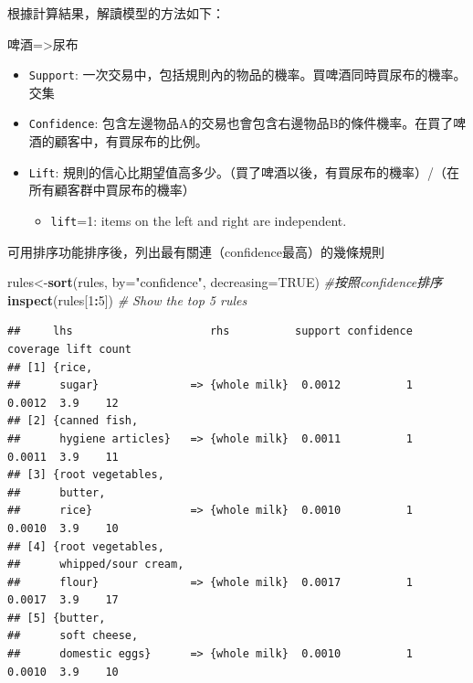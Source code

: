 \documentclass[
]{book}
\newenvironment{Shaded}{\begin{snugshade}}{\end{snugshade}}
\newcommand{\CommentTok}[1]{\textcolor[rgb]{0.56,0.35,0.01}{\textit{#1}}}
\newcommand{\DataTypeTok}[1]{\textcolor[rgb]{0.13,0.29,0.53}{#1}}
\newcommand{\DecValTok}[1]{\textcolor[rgb]{0.00,0.00,0.81}{#1}}
\newcommand{\KeywordTok}[1]{\textcolor[rgb]{0.13,0.29,0.53}{\textbf{#1}}}
\newcommand{\NormalTok}[1]{#1}
\newcommand{\OperatorTok}[1]{\textcolor[rgb]{0.81,0.36,0.00}{\textbf{#1}}}
\newcommand{\OtherTok}[1]{\textcolor[rgb]{0.56,0.35,0.01}{#1}}
\newcommand{\StringTok}[1]{\textcolor[rgb]{0.31,0.60,0.02}{#1}}
\providecommand{\tightlist}{%
  \setlength{\itemsep}{0pt}\setlength{\parskip}{0pt}}
\begin{document}
根據計算結果，解讀模型的方法如下：

啤酒=\textgreater 尿布

\begin{itemize}
\tightlist
\item
  \texttt{Support}: 一次交易中，包括規則內的物品的機率。買啤酒同時買尿布的機率。交集
\item
  \texttt{Confidence}: 包含左邊物品A的交易也會包含右邊物品B的條件機率。在買了啤酒的顧客中，有買尿布的比例。
\item
  \texttt{Lift}: 規則的信心比期望值高多少。（買了啤酒以後，有買尿布的機率）/（在所有顧客群中買尿布的機率）

  \begin{itemize}
  \tightlist
  \item
    \texttt{lift}=1: items on the left and right are independent.
  \end{itemize}
\end{itemize}

可用排序功能排序後，列出最有關連（confidence最高）的幾條規則

\begin{Shaded}
\begin{Highlighting}[]
\NormalTok{rules<-}\KeywordTok{sort}\NormalTok{(rules, }\DataTypeTok{by=}\StringTok{"confidence"}\NormalTok{, }\DataTypeTok{decreasing=}\OtherTok{TRUE}\NormalTok{) }\CommentTok{#按照confidence排序}
\KeywordTok{inspect}\NormalTok{(rules[}\DecValTok{1}\OperatorTok{:}\DecValTok{5}\NormalTok{]) }\CommentTok{# Show the top 5 rules}
\end{Highlighting}
\end{Shaded}

\begin{verbatim}
##     lhs                     rhs          support confidence coverage lift count
## [1] {rice,                                                                     
##      sugar}              => {whole milk}  0.0012          1   0.0012  3.9    12
## [2] {canned fish,                                                              
##      hygiene articles}   => {whole milk}  0.0011          1   0.0011  3.9    11
## [3] {root vegetables,                                                          
##      butter,                                                                   
##      rice}               => {whole milk}  0.0010          1   0.0010  3.9    10
## [4] {root vegetables,                                                          
##      whipped/sour cream,                                                       
##      flour}              => {whole milk}  0.0017          1   0.0017  3.9    17
## [5] {butter,                                                                   
##      soft cheese,                                                              
##      domestic eggs}      => {whole milk}  0.0010          1   0.0010  3.9    10
\end{verbatim}
\end{document}
